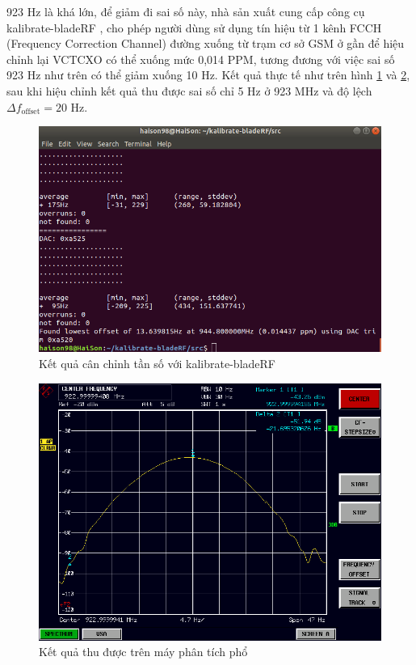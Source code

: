 923 Hz là khá lớn, để giảm đi sai số này, nhà sản xuất cung cấp công cụ kalibrate-bladeRF \cite{kali}, cho phép người dùng sử dụng tín hiệu từ 1 kênh FCCH (Frequency Correction Channel) đường xuống từ trạm cơ sở GSM ở gần để hiệu chỉnh lại VCTCXO có thể xuống mức 0,014 PPM, tương đương với việc sai số 923 Hz như trên có thể giảm xuống 10 Hz. Kết quả thực tế như trên hình \ref{fig:freqcal} và \ref{fig:freqanly}, sau khi hiệu chỉnh kết quả thu được sai số chỉ 5 Hz ở 923 MHz và độ lệch $\Delta f_{\mathrm{offset}} = 20\textrm{ Hz}$.
\begin{figure} [!h]
	\centering
	\includegraphics[width=0.85\linewidth]{figures/freqcal.png}
	\caption{Kết quả cân chỉnh tần số với kalibrate-bladeRF}
	\label{fig:freqcal}
\end{figure}


\begin{figure} [!ht]
	\centering
	\includegraphics[width=0.85\linewidth]{figures/freqanly.png}
	\caption{Kết quả thu được trên máy phân tích phổ}
	\label{fig:freqanly}
\end{figure}

